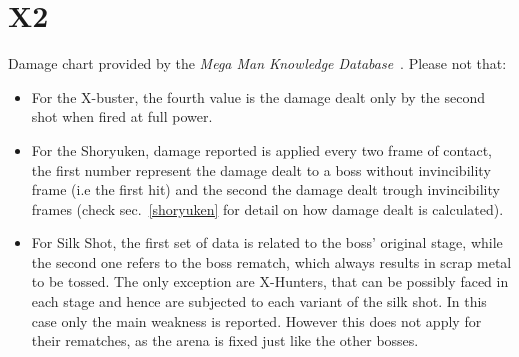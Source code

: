 \section{X2}
Damage chart provided by the \emph{Mega Man Knowledge Database}~\cite{wiki:damage_chart_X2}. 
Please not that:
\begin{itemize}
\item For the X-buster, the fourth value is the damage dealt only by the second shot when fired at full power.
\item For the Shoryuken, damage reported is applied every two frame of contact, the first number represent the damage dealt to a boss without invincibility frame (i.e the first hit) and the second the damage dealt trough invincibility frames (check sec.~\ref{shoryuken} for detail on how damage dealt is calculated).

\item For Silk Shot, the first set of data is related to the boss' original stage, while the second one refers to the boss rematch, which always results in scrap metal to be tossed. The only exception are X-Hunters, that can be possibly faced in each stage and hence are subjected to each variant of the silk shot. In this case only the main weakness is reported. However this does not apply for their rematches, as the arena is fixed just like the other bosses.%
\end{itemize}

